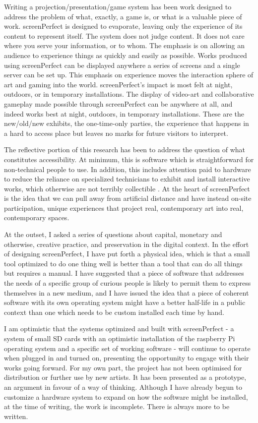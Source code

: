 Writing a projection/presentation/game system has been work designed to address the problem of what, exactly, a game is, or what is a valuable piece of work. screenPerfect is designed to evaporate, leaving only the experience of its content to represent itself. The system does not judge content. It does not care where you serve your information, or to whom. The emphasis is on allowing an audience to experience things as quickly and easily as possible. Works produced using screenPerfect can be displayed anywhere a series of screens and a single server can be set up. This emphasis on experience moves the interaction sphere of art and gaming into the world. screenPerfect's impact is most felt at night, outdoors, or in temporary installations. The display of video-art and collaborative gameplay made possible through screenPerfect can be anywhere at all, and indeed works best at night, outdoors, in temporary installations. These are the new/old/new exhibits, the one-time-only parties, the experience that happens in a hard to access place but leaves no marks for future visitors to interpret.

The reflective portion of this research has been to address the question of what constitutes accessibility. At minimum, this is software which is straightforward for non-technical people to use. In addition, this includes attention paid to hardware to reduce the reliance on specialized technicians to exhibit and install interactive works, which otherwise are not terribly collectible \cite{lisanotes}. At the heart of screenPerfect is the idea that we can pull away from artificial distance and have instead on-site participation, unique experiences that project real, contemporary art into real, contemporary spaces.

At the outset, I asked a series of questions about capital, monetary and otherwise, creative practice, and preservation in the digital context. In the effort of designing screenPerfect, I have put forth a physical idea, which is that a small tool optimized to do one thing well is better than a tool that can do all things but requires a manual. I have suggested that a piece of software that addresses the needs of a specific group of curious people is likely to permit them to express themselves in a new medium, and I have issued the idea that a piece of coherent software with its own operating system might have a better half-life in a public context than one which needs to be custom installed each time by hand. 

I am optimistic that the systems optimized and built with screenPerfect - a system of small SD cards with an optimistic installation of the raspberry Pi operating system and a specific set of working software - will continue to operate when plugged in and turned on, presenting the opportunity to engage with their works going forward. For my own part, the project has not been optimised for distribution or further use by new artists. It has been presented as a prototype, an argument in favour of a way of thinking. Although I have already begun to customize a hardware system to expand on how the software might be installed, at the time of writing, the work is incomplete. There is always more to be written.